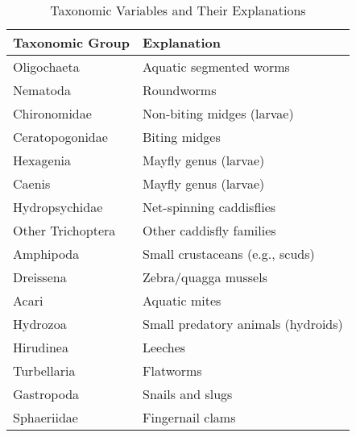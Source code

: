 \begin{table}[htbp]
\centering
\caption{Taxonomic Variables and Their Explanations}
\label{tab:taxonomic_variables}
\renewcommand{\arraystretch}{1.3}
\begin{tabular}{|>{\centering\arraybackslash}m{4.5cm}|>{\centering\arraybackslash}m{7.5cm}|}
\hline
\textbf{Taxonomic Group} & \textbf{Explanation} \\
\hline
Oligochaeta & Aquatic segmented worms \\
Nematoda & Roundworms \\
Chironomidae & Non-biting midges (larvae) \\
Ceratopogonidae & Biting midges \\
Hexagenia & Mayfly genus (larvae) \\
Caenis & Mayfly genus (larvae) \\
Hydropsychidae & Net-spinning caddisflies \\
Other Trichoptera & Other caddisfly families \\
Amphipoda & Small crustaceans (e.g., scuds) \\
Dreissena & Zebra/quagga mussels \\
Acari & Aquatic mites \\
Hydrozoa & Small predatory animals (hydroids) \\
Hirudinea & Leeches \\
Turbellaria & Flatworms \\
Gastropoda & Snails and slugs \\
Sphaeriidae & Fingernail clams \\
\hline
\end{tabular}
\end{table}

